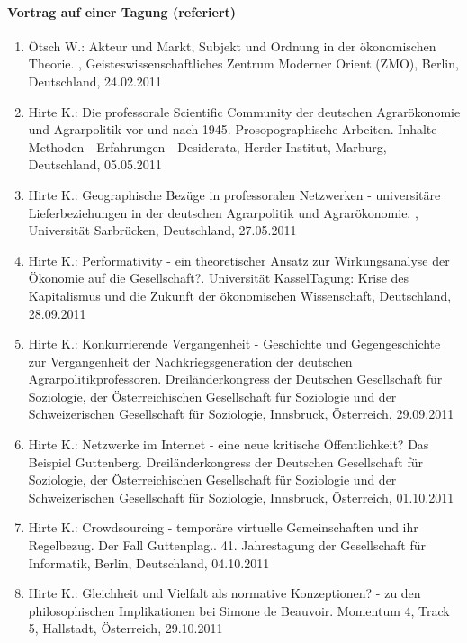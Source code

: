 \paragraph{Vortrag auf einer Tagung (referiert)}
\begin{enumerate}
	\item Ötsch W.: Akteur und Markt, Subjekt und Ordnung in der ökonomischen Theorie. , Geisteswissenschaftliches Zentrum Moderner Orient (ZMO), Berlin, Deutschland, 24.02.2011
	\item Hirte K.: Die professorale Scientific Community der deutschen Agrarökonomie und Agrarpolitik vor und nach 1945. Prosopographische Arbeiten. Inhalte - Methoden - Erfahrungen - Desiderata, Herder-Institut, Marburg, Deutschland, 05.05.2011
	\item Hirte K.: Geographische Bezüge in professoralen Netzwerken - universitäre Lieferbeziehungen in der deutschen Agrarpolitik und Agrarökonomie. , Universität Sarbrücken, Deutschland, 27.05.2011
	\item Hirte K.: Performativity - ein theoretischer Ansatz zur Wirkungsanalyse der Ökonomie auf die Gesellschaft?. Universität KasselTagung: Krise des Kapitalismus und die Zukunft der ökonomischen Wissenschaft, Deutschland, 28.09.2011
	\item Hirte K.: Konkurrierende Vergangenheit - Geschichte und Gegengeschichte zur Vergangenheit der Nachkriegsgeneration der deutschen Agrarpolitikprofessoren. Dreiländerkongress der Deutschen Gesellschaft für Soziologie, der Österreichischen Gesellschaft für Soziologie und der Schweizerischen Gesellschaft für Soziologie, Innsbruck, Österreich, 29.09.2011
	\item Hirte K.: Netzwerke im Internet - eine neue kritische Öffentlichkeit? Das Beispiel Guttenberg. Dreiländerkongress der Deutschen Gesellschaft für Soziologie, der Österreichischen Gesellschaft für Soziologie und der Schweizerischen Gesellschaft für Soziologie, Innsbruck, Österreich, 01.10.2011
	\item Hirte K.: Crowdsourcing - temporäre virtuelle Gemeinschaften und ihr Regelbezug. Der Fall Guttenplag.. 41. Jahrestagung der Gesellschaft für Informatik, Berlin, Deutschland, 04.10.2011
	\item Hirte K.: Gleichheit und Vielfalt als normative Konzeptionen? - zu den philosophischen Implikationen bei Simone de Beauvoir. Momentum 4, Track 5, Hallstadt, Österreich, 29.10.2011
\end{enumerate}
